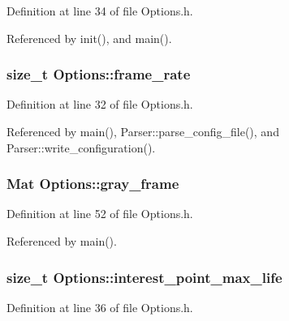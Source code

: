 \-Definition at line 34 of file \-Options.\-h.



\-Referenced by init(), and main().

\hypertarget{class_options_a466a2a141ee2c3ecb3082566ede72ad3}{
\subsubsection[{frame\-\_\-rate}]{\setlength{\rightskip}{0pt plus 5cm}size\-\_\-t {\bf \-Options\-::frame\-\_\-rate}}}
\label{class_options_a466a2a141ee2c3ecb3082566ede72ad3}


\-Definition at line 32 of file \-Options.\-h.



\-Referenced by main(), \-Parser\-::parse\-\_\-config\-\_\-file(), and \-Parser\-::write\-\_\-configuration().

\hypertarget{class_options_a248f35435160e654dc509fa347afd6e4}{
\subsubsection[{gray\-\_\-frame}]{\setlength{\rightskip}{0pt plus 5cm}\-Mat {\bf \-Options\-::gray\-\_\-frame}}}
\label{class_options_a248f35435160e654dc509fa347afd6e4}


\-Definition at line 52 of file \-Options.\-h.



\-Referenced by main().

\hypertarget{class_options_ad83ab0070ddb7097311ee3dd2cecabb3}{
\subsubsection[{interest\-\_\-point\-\_\-max\-\_\-life}]{\setlength{\rightskip}{0pt plus 5cm}size\-\_\-t {\bf \-Options\-::interest\-\_\-point\-\_\-max\-\_\-life}}}
\label{class_options_ad83ab0070ddb7097311ee3dd2cecabb3}


\-Definition at line 36 of file \-Options.\-h.



